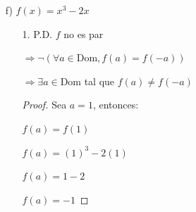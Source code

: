 \documentclass{article}
\begin{document}
\begin{enumerate}
\begin{enumerate}
\begin{enumerate}
                \(\Rightarrow \exists a \in \text{Dom}\) tal que \(f(a) \neq -f(-a)\)
                
                \begin{proof} Sea \(a = 1\), entonces:
                
                \(f(a) = f(1)\)
                
                \(f(a) = (1)^3 - (1)^2 - 1\)
                
                \(f(a) = -1\)
                \vspace{\baselineskip}
                
                Y también:
                
                \(-f(-a) = -f(-1)\)
                
                \(-f(-a) = -[(-1)^3 - (-1)^2 - 1]\)
                
                \(-f(a) = 3\)
                \vspace{\baselineskip}
                Así, vemos que para alguna \(a\):
                
                \(f(a) \neq -f(-a)\)
                \end{proof}
            \end{enumerate}
            \vspace{\baselineskip}
            
        \item[f)] \(f(x) = x^3 - 2x\)
            \begin{enumerate}
                \item[1.] P.D. \( f \) no es par
                
                \(\Rightarrow \neg(\forall a \in \text{Dom}, f(a) = f(-a))\)
                
                \(\Rightarrow \exists a \in \text{Dom}\) tal que \(f(a) \neq f(-a)\)
                
                \begin{proof} Sea \(a = 1\), entonces:
                
                \(f(a) = f(1)\)
                
                \(f(a) = (1)^3 - 2(1)\)
                
                \(f(a) = 1 - 2\)
                
                \(f(a) = -1\)
                \vspace{\baselineskip}
                

\end{proof}
\end{enumerate}
\end{enumerate}
\end{enumerate}
\end{document}
